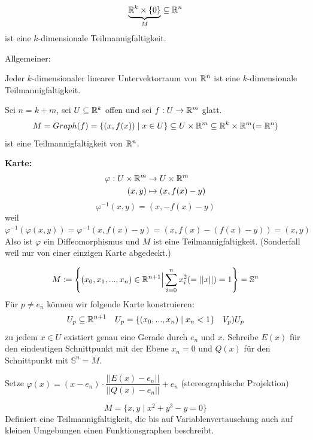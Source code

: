 \documentclass[main.tex]{subfiles}
\begin{document}
\begin{Beispiel}
  $$\underbrace{\mathbb{R}^k \times \{0\}}_{M} \subseteq \mathbb{R}^n$$
  ist eine $k$-dimensionale Teilmannigfaltigkeit.

  Allgemeiner:
  \begin{Theorem}
    Jeder $k$-dimensionaler linearer Untervektorraum von $\mathbb{R}^n$ ist eine $k$-dimensionale Teilmannigfaltigkeit.
  \end{Theorem}
\end{Beispiel}

\begin{Beispiel}
  Sei $n = k +m$, sei $U \subseteq \mathbb{R}^k$ offen und sei $f:U\to \mathbb{R}^m$ glatt.
  $$M = Graph(f) = \{(x,f(x)) \mid x \in U \} \subseteq U \times \mathbb{R}^m \subseteq \mathbb{R}^k \times \mathbb{R}^m (= \mathbb{R}^n)$$
  ist eine Teilmannigfaltigkeit von $\mathbb{R}^n$.

  \textbf{Karte:}
  $$\begin{aligned}
    \varphi : U \times \mathbb{R}^m & \to U \times \mathbb{R}^m \\
    (x,y) & \mapsto (x,f(x)-y)
  \end{aligned}$$
  $$\varphi^{-1}(x,y) = (x,-f(x)-y)$$
  weil $\varphi^{-1}(\varphi(x,y)) = \varphi^{-1}(x,f(x)-y) = (x,f(x)-(f(x)-y)) = (x,y)$
  Also ist $\varphi$ ein Diffeomorphismus und $M$ ist eine Teilmannigfaltigkeit. (Sonderfall weil nur von einer einzigen Karte abgedeckt.)
\end{Beispiel}

\begin{Beispiel}[Einheitssphäre]
  $$M := \left \{ (x_0,x_1,...,x_n) \in \mathbb{R}^{n+1} \Big | \sum \limits_{i=0}^n x_i^2 (= ||x||) = 1 \right \} = \mathbb{S}^n$$
  Für $p \neq e_n$ können wir folgende Karte konstruieren:
  $$U_p \subseteq \mathbb{R}^{n+1} \quad U_p = \{(x_0,...,x_n) \mid x_n < 1\} \quad V_p ) U_p$$
  zu jedem $x \in U$ existiert genau eine Gerade durch $e_n$ und $x$. Schreibe $E(x)$ für den eindeutigen Schnittpunkt mit der Ebene $x_n = 0$ und $Q(x)$ für den Schnittpunkt mit $\mathbb{S}^n = M$.

  Setze $\varphi(x) = (x - e_n) \cdot \dfrac{||E(x) - e_n||}{||Q(x)-e_n||} + e_n$ (stereographische Projektion)
\end{Beispiel}

\begin{Beispiel}
  $$M = \{x,y \mid x^2 + y^3 - y = 0\}$$
  Definiert eine Teilmannigfaltigkeit, die bis auf Variablenvertauschung auch auf kleinen Umgebungen einen Funktionsgraphen beschreibt.
\end{Beispiel}
\end{document}
